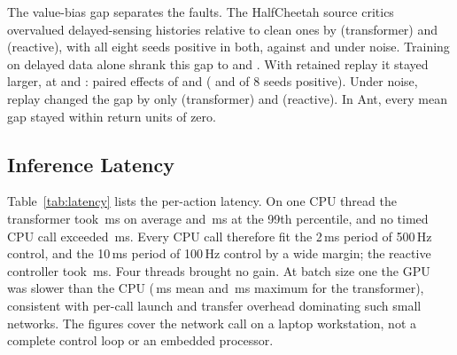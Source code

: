 The value-bias gap separates the faults. The HalfCheetah source critics overvalued delayed-sensing histories relative to clean ones by  (transformer) and  (reactive), with all eight seeds positive in both, against  and  under noise. Training on delayed data alone shrank this gap to  and . With retained replay it stayed larger, at  and : paired effects of   and   ( and  of 8 seeds positive). Under noise, replay changed the gap by only  (transformer) and  (reactive). In Ant, every mean gap stayed within  return units of zero.



\subsection{Inference Latency}
Table~\ref{tab:latency} lists the per-action latency. On one CPU thread the transformer took \,ms on average and \,ms at the 99th percentile, and no timed CPU call exceeded \,ms. Every CPU call therefore fit the 2\,ms period of 500\,Hz control, and the 10\,ms period of 100\,Hz control by a wide margin; the reactive controller took \,ms. Four threads brought no gain. At batch size one the GPU was slower than the CPU (\,ms mean and \,ms maximum for the transformer), consistent with per-call launch and transfer overhead dominating such small networks. The figures cover the network call on a laptop workstation, not a complete control loop or an embedded processor.
